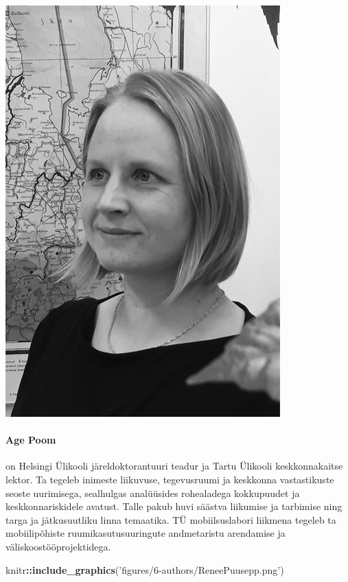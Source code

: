 \documentclass[estonian,]{article}
\newenvironment{Shaded}{\begin{snugshade}}{\end{snugshade}}
\newcommand{\KeywordTok}[1]{\textcolor[rgb]{0.13,0.29,0.53}{\textbf{#1}}}
\newcommand{\NormalTok}[1]{#1}
\newcommand{\OperatorTok}[1]{\textcolor[rgb]{0.81,0.36,0.00}{\textbf{#1}}}
\newcommand{\StringTok}[1]{\textcolor[rgb]{0.31,0.60,0.02}{#1}}
\let\oldparagraph\paragraph
\renewcommand{\paragraph}[1]{\oldparagraph{#1}\mbox{}}
\begin{document}
\begin{flushleft}\includegraphics[width=0.5\linewidth]{figures/6-authors/AgePoom} \end{flushleft}

\hypertarget{age-poom}{%
\paragraph{Age Poom}\label{age-poom}}

on Helsingi Ülikooli järeldoktorantuuri teadur ja Tartu Ülikooli keskkonnakaitse lektor. Ta tegeleb inimeste liikuvuse, tegevusruumi ja keskkonna vastastikuste seoste uurimisega, sealhulgas analüüsides rohealadega kokkupuudet ja keskkonnariskidele avatust. Talle pakub huvi säästva liikumise ja tarbimise ning targa ja jätkusuutliku linna temaatika. TÜ mobiilsuslabori liikmena tegeleb ta mobiilipõhiste ruumikasutusuuringute andmetaristu arendamise ja väliskoostööprojektidega.

\begin{Shaded}
\begin{Highlighting}[]
\NormalTok{knitr}\OperatorTok{::}\KeywordTok{include_graphics}\NormalTok{(}\StringTok{'figures/6-authors/ReneePuusepp.png'}\NormalTok{)}
\end{Highlighting}
\end{Shaded}
\end{document}
